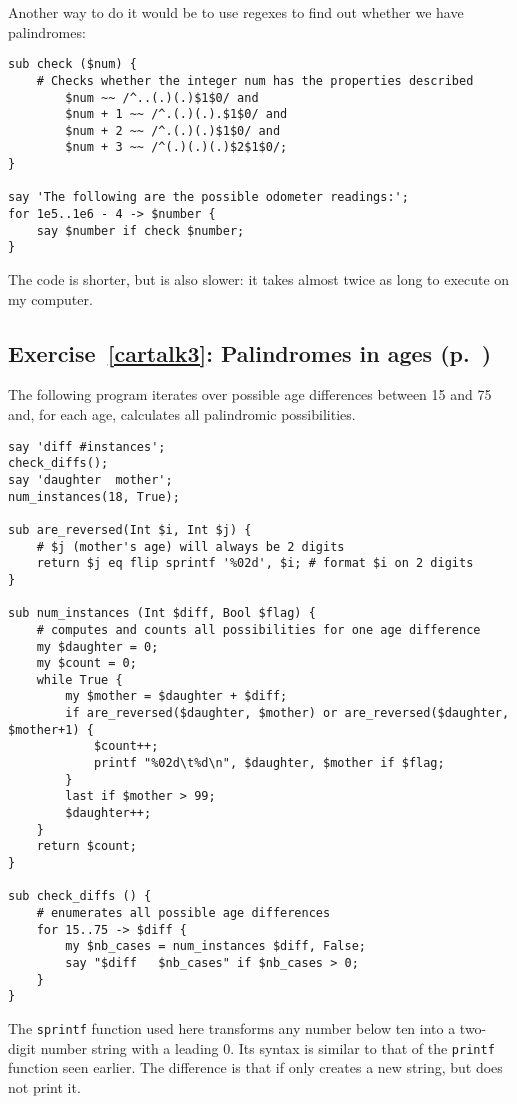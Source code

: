 Another way to do it would be to use regexes to find out whether 
we have palindromes:

\begin{verbatim}
sub check ($num) {
    # Checks whether the integer num has the properties described
        $num ~~ /^..(.)(.)$1$0/ and 
        $num + 1 ~~ /^.(.)(.).$1$0/ and 
        $num + 2 ~~ /^.(.)(.)$1$0/ and 
        $num + 3 ~~ /^(.)(.)(.)$2$1$0/;
}

say 'The following are the possible odometer readings:';
for 1e5..1e6 - 4 -> $number {
    say $number if check $number;
}
\end{verbatim}

The code is shorter, but is also slower: it takes almost twice 
as long to execute on my computer.


\subsection{Exercise~\ref{cartalk3}: Palindromes in ages (p.~\pageref{cartalk3})}
\label{sol_cartalk3}

The following program iterates over possible age differences 
between 15 and 75 and, for each age, calculates all 
palindromic possibilities.

\begin{verbatim}
say 'diff #instances';
check_diffs();
say 'daughter  mother';
num_instances(18, True);

sub are_reversed(Int $i, Int $j) {
    # $j (mother's age) will always be 2 digits
    return $j eq flip sprintf '%02d', $i; # format $i on 2 digits
}

sub num_instances (Int $diff, Bool $flag) {
    # computes and counts all possibilities for one age difference
    my $daughter = 0;
    my $count = 0;
    while True {
        my $mother = $daughter + $diff;
        if are_reversed($daughter, $mother) or are_reversed($daughter, $mother+1) {
            $count++;
            printf "%02d\t%d\n", $daughter, $mother if $flag;
        }
        last if $mother > 99;
        $daughter++;
    }
    return $count;
}

sub check_diffs () {
    # enumerates all possible age differences
    for 15..75 -> $diff {
        my $nb_cases = num_instances $diff, False;
        say "$diff   $nb_cases" if $nb_cases > 0;
    }
}
\end{verbatim}

The {\tt sprintf} function used here transforms any number 
below ten into a two-digit number string with a leading 0. 
Its syntax is similar to that of the {\tt printf} function 
seen earlier. The difference is that if only creates a new 
string, but does not print it.

